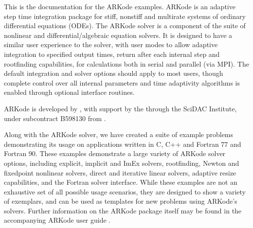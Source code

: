 \documentclass[letterpaper,10pt,english]{sphinxmanual}
\begin{document}
\newpage{\pagestyle{empty}\cleardoublepage}



\pagestyle{plain}
\sphinxtableofcontents
\pagestyle{normal}
\label{\detokenize{index::doc}}


\sphinxAtStartPar
This is the documentation for the ARKode examples.  ARKode is an
adaptive step time integration package for stiff, nonstiff and
multi\sphinxhyphen{}rate systems of ordinary differential equations (ODEs).
The ARKode solver is a component of the  suite of
nonlinear and differential/algebraic equation solvers. It is designed
to have a similar user experience to the 
solver, with user modes to allow adaptive integration to specified
output times, return after each internal step and root\sphinxhyphen{}finding
capabilities, for calculations both in serial and parallel (via
MPI). The default integration and solver options should apply to most
users, though complete control over all internal parameters and time
adaptivity algorithms is enabled through optional interface routines.

\sphinxAtStartPar
ARKode is developed by , with support by the  through the  SciDAC Institute, under subcontract
B598130 from .

\sphinxAtStartPar
Along with the ARKode solver, we have created a suite of example
problems demonstrating its usage on applications written in C, C++ and
Fortran 77 and Fortran 90.  These examples demonstrate a large variety
of ARKode solver options, including explicit, implicit and ImEx
solvers, root\sphinxhyphen{}finding, Newton and fixed\sphinxhyphen{}point nonlinear solvers,
direct and iterative linear solvers, adaptive resize capabilities, and
the Fortran solver interface.  While these examples are not an
exhaustive set of all possible usage scenarios, they are designed to
show a variety of exemplars, and can be used as templates for new
problems using ARKode’s solvers.  Further information on the ARKode
package itself may be found in the accompanying ARKode user guide
.
\end{document}
